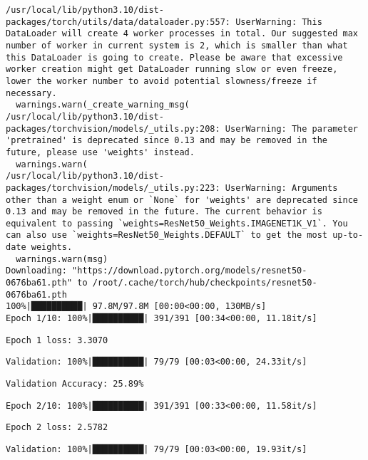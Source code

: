 \documentclass[
  letterpaper,
  DIV=11,
  numbers=noendperiod]{scrreprt}
\begin{document}
\begin{verbatim}
/usr/local/lib/python3.10/dist-packages/torch/utils/data/dataloader.py:557: UserWarning: This DataLoader will create 4 worker processes in total. Our suggested max number of worker in current system is 2, which is smaller than what this DataLoader is going to create. Please be aware that excessive worker creation might get DataLoader running slow or even freeze, lower the worker number to avoid potential slowness/freeze if necessary.
  warnings.warn(_create_warning_msg(
/usr/local/lib/python3.10/dist-packages/torchvision/models/_utils.py:208: UserWarning: The parameter 'pretrained' is deprecated since 0.13 and may be removed in the future, please use 'weights' instead.
  warnings.warn(
/usr/local/lib/python3.10/dist-packages/torchvision/models/_utils.py:223: UserWarning: Arguments other than a weight enum or `None` for 'weights' are deprecated since 0.13 and may be removed in the future. The current behavior is equivalent to passing `weights=ResNet50_Weights.IMAGENET1K_V1`. You can also use `weights=ResNet50_Weights.DEFAULT` to get the most up-to-date weights.
  warnings.warn(msg)
Downloading: "https://download.pytorch.org/models/resnet50-0676ba61.pth" to /root/.cache/torch/hub/checkpoints/resnet50-0676ba61.pth
100%|██████████| 97.8M/97.8M [00:00<00:00, 130MB/s]
Epoch 1/10: 100%|██████████| 391/391 [00:34<00:00, 11.18it/s]
\end{verbatim}

\begin{verbatim}
Epoch 1 loss: 3.3070
\end{verbatim}

\begin{verbatim}
Validation: 100%|██████████| 79/79 [00:03<00:00, 24.33it/s]
\end{verbatim}

\begin{verbatim}
Validation Accuracy: 25.89%
\end{verbatim}

\begin{verbatim}
Epoch 2/10: 100%|██████████| 391/391 [00:33<00:00, 11.58it/s]
\end{verbatim}

\begin{verbatim}
Epoch 2 loss: 2.5782
\end{verbatim}

\begin{verbatim}
Validation: 100%|██████████| 79/79 [00:03<00:00, 19.93it/s]
\end{verbatim}
\end{document}
